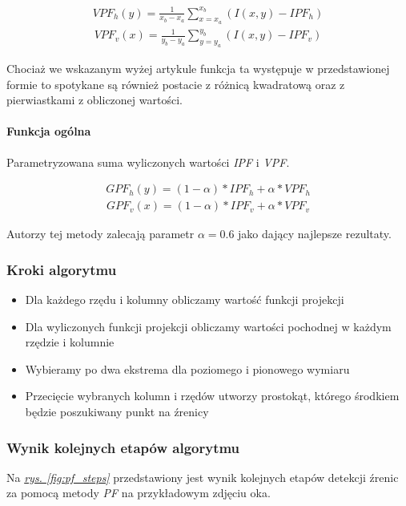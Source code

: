 \begin{align}
    {VPF_h}(y)=\frac{1}{{x_b}-{x_a}}\sum_{x={x_a}}^{{x_b}} (I(x,y) - {IPF_h})
\end{align}
\begin{align}
    {VPF_v}(x)=\frac{1}{{y_b}-{y_a}}\sum_{y={y_a}}^{{y_b}} (I(x,y) - {IPF_v})
\end{align}

Chociaż we wskazanym wyżej artykule funkcja ta występuje w przedstawionej formie to spotykane są również postacie z różnicą kwadratową oraz z pierwiastkami z obliczonej wartości. 

\paragraph{Funkcja ogólna} Parametryzowana suma wyliczonych wartości \textit{IPF} i \textit{VPF}.

\begin{align}
    {GPF_h}(y)=(1-\alpha) * {IPF_h} + \alpha * {VPF_h}
\end{align}
\begin{align}
    {GPF_v}(x)=(1-\alpha) * {IPF_v} + \alpha * {VPF_v} 
\end{align}

Autorzy tej metody zalecają parametr $\alpha = 0.6$ jako dający najlepsze rezultaty.

\subsubsection{Kroki algorytmu}

\begin{itemize}
    \item Dla każdego rzędu i kolumny obliczamy wartość funkcji projekcji
    \item Dla wyliczonych funkcji projekcji obliczamy wartości pochodnej w każdym rzędzie i kolumnie
    \item Wybieramy po dwa ekstrema dla poziomego i pionowego wymiaru
    \item Przecięcie wybranych kolumn i rzędów utworzy prostokąt, którego środkiem będzie poszukiwany punkt na źrenicy 
\end{itemize}

\subsubsection{Wynik kolejnych etapów algorytmu}
Na \hyperref[{fig:pf_steps}]{\textit{rys. \ref{fig:pf_steps}}} przedstawiony jest wynik kolejnych etapów detekcji źrenic za pomocą metody \textit{PF} na przykładowym zdjęciu oka.

